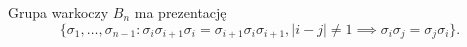 \begin{proposition}
    Grupa warkoczy $B_n$ ma prezentację
    \begin{equation}
        \{
            \sigma_1, \ldots, \sigma_{n-1} :
            \sigma_i\sigma_{i+1} \sigma_i = \sigma_{i+1} \sigma_i \sigma_{i+1},
            |i-j| \neq 1 \implies \sigma_i \sigma_j = \sigma_j \sigma_i
        \}.
    \end{equation}
\end{proposition}

